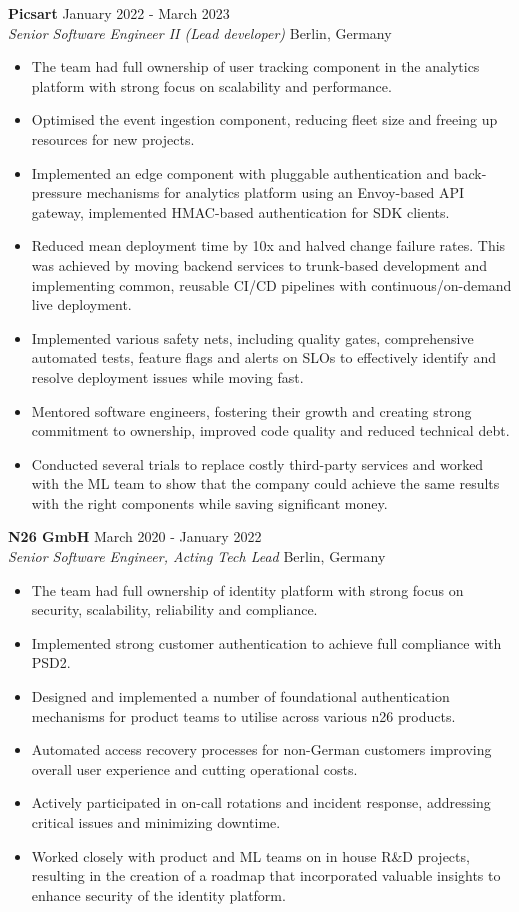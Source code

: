 \documentclass[a4paper]{article}
\newcommand{\employer} [4] {
    \textbf{#1} \hfill {#3} \\
    \textit{#2} \hfill {#4} \\
    \vspace{0mm}
}
\begin{document}
    \employer{Picsart}{Senior Software Engineer II (Lead developer)}{January 2022 - March 2023}{Berlin, Germany}
    \begin{itemize}[itemsep=-1mm]
        \item The team had full ownership of user tracking component in the analytics platform with strong focus
        on scalability and performance.
        \item Optimised the event ingestion component, reducing fleet size and freeing up resources for new projects.
        \item Implemented an edge component with pluggable authentication and back-pressure mechanisms for analytics platform
        using an Envoy-based API gateway, implemented HMAC-based authentication for SDK clients.
        \item Reduced mean deployment time by 10x and halved change failure rates.
        This was achieved by moving backend services to trunk-based development and implementing common, reusable CI/CD pipelines with
        continuous/on-demand live deployment.
        \item Implemented various safety nets, including quality gates, comprehensive automated tests,
        feature flags and alerts on SLOs to effectively identify and resolve deployment issues while moving fast.
        \item Mentored software engineers, fostering their growth and creating strong commitment to ownership,
        improved code quality and reduced technical debt.
        \item Conducted several trials to replace costly third-party services and worked with the ML team to show that the company
        could achieve the same results with the right components while saving significant money.
    \end{itemize}

    \employer{N26 GmbH}{Senior Software Engineer, Acting Tech Lead}{March 2020 - January 2022}{Berlin, Germany}
    \begin{itemize}[itemsep=-1mm]
        \item The team had full ownership of identity platform with strong focus on security, scalability, reliability and compliance.
        \item Implemented strong customer authentication to achieve full compliance with PSD2.
        \item Designed and implemented a number of foundational authentication mechanisms for product teams to utilise across various n26 products.
        \item Automated access recovery processes for non-German customers improving overall user experience and cutting operational costs.
        \item Actively participated in on-call rotations and incident response, addressing critical issues and minimizing downtime.
        \item Worked closely with product and ML teams on in house R\&D projects, resulting in the creation of a roadmap that
        incorporated valuable insights to enhance security of the identity platform.
    \end{itemize}
\end{document}
